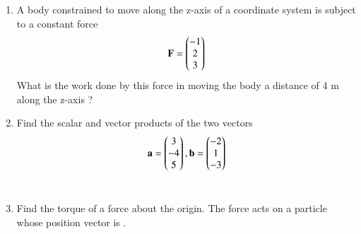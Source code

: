\begin{enumerate}[label=\arabic*.,ref=\thesubsection.\theenumi]
\item A body constrained to move along the z-axis of a coordinate system is subject to a constant force
\begin{align}
\mathbf{F} = \begin{pmatrix}-1\\2\\3\end{pmatrix}
\end{align}
%
What is the work done by this force in moving the body a distance of 4 m along the z-axis ?
\\
\solution 

\item Find the scalar and vector products of the two vectors
\begin{align}
\mathbf{a} = \begin{pmatrix}3\\-4\\5\end{pmatrix}, 
\mathbf{b} = \begin{pmatrix}-2\\1\\-3\end{pmatrix}
\end{align}
%
\\
\solution 

\item Find the torque of a force 
about the origin. The force
acts on a particle whose position vector is .
\\
\solution 

\end{enumerate}
%
